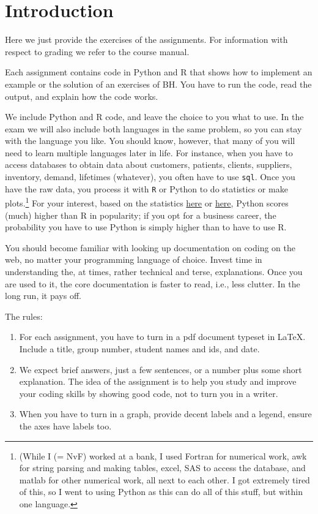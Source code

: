 \section*{Introduction}

Here we just provide the exercises of the assignments.  For information with respect to grading we refer to the course manual.

Each assignment contains code in Python and R that shows how to implement an example or the solution of an exercises of BH. You have to run the code, read the output, and explain how the code works.

We include Python and R code, and leave the choice to you what to use.
In the exam we will also include both languages in the same problem, so you can stay with the language you like.
You should know, however, that many of you will need to learn multiple languages later in life.
For instance, when you have to access databases to obtain data about customers, patients, clients, suppliers, inventory, demand, lifetimes (whatever), you often have to use \texttt{sql}.
Once you have the raw data, you process it with \texttt{R} or Python to do statistics or make plots.\footnote{(While I (= NvF) worked at a bank, I used Fortran for numerical work, awk for string parsing and making tables, excel, SAS to access the database, and matlab for other numerical work, all next to each other.
I got extremely tired of this, so I went to using Python as this can do all of this stuff, but within one language.}
For your interest, based on the statistics \href{https://www.tiobe.com/tiobe-index/}{here} or \href{https://www.northeastern.edu/graduate/blog/most-popular-programming-languages/}{here}, Python scores (much) higher than R in popularity; if you opt for a business career, the probability you have to use Python is simply higher than to have to use R.

You should become familiar with looking up documentation on coding on the web, no matter your programming language of choice. Invest time in understanding the, at times, rather technical and terse, explanations.  Once you are used to it, the core documentation is faster to read, i.e., less clutter. In the long run, it pays off.



The rules:
\begin{enumerate}
\item For each assignment, you have to turn in a pdf document typeset in \LaTeX{}. Include a title, group number, student names and ids, and date.
\item We expect brief answers, just a few sentences, or a number plus some short explanation. The idea of the assignment is to help you study and improve your coding skills by showing good code, not to turn you in a writer.
\item When you have to turn in a graph, provide decent labels and a legend, ensure the axes have labels too.
\end{enumerate}
